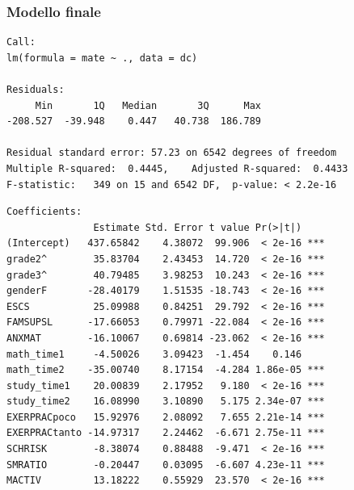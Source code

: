 \documentclass{beamer}
\begin{document}

\begin{frame}[fragile]

\frametitle{Modello finale}
{\footnotesize
\begin{verbatim}
Call:
lm(formula = mate ~ ., data = dc)

Residuals:
     Min       1Q   Median       3Q      Max 
-208.527  -39.948    0.447   40.738  186.789 

Residual standard error: 57.23 on 6542 degrees of freedom
Multiple R-squared:  0.4445,	Adjusted R-squared:  0.4433 
F-statistic:   349 on 15 and 6542 DF,  p-value: < 2.2e-16
\end{verbatim}
}
\end{frame}


\begin{frame}[fragile]

{\footnotesize
\begin{verbatim}
Coefficients:
               Estimate Std. Error t value Pr(>|t|)    
(Intercept)   437.65842    4.38072  99.906  < 2e-16 ***
grade2^        35.83704    2.43453  14.720  < 2e-16 ***
grade3^        40.79485    3.98253  10.243  < 2e-16 ***
genderF       -28.40179    1.51535 -18.743  < 2e-16 ***
ESCS           25.09988    0.84251  29.792  < 2e-16 ***
FAMSUPSL      -17.66053    0.79971 -22.084  < 2e-16 ***
ANXMAT        -16.10067    0.69814 -23.062  < 2e-16 ***
math_time1     -4.50026    3.09423  -1.454    0.146    
math_time2    -35.00740    8.17154  -4.284 1.86e-05 ***
study_time1    20.00839    2.17952   9.180  < 2e-16 ***
study_time2    16.08990    3.10890   5.175 2.34e-07 ***
EXERPRACpoco   15.92976    2.08092   7.655 2.21e-14 ***
EXERPRACtanto -14.97317    2.24462  -6.671 2.75e-11 ***
SCHRISK        -8.38074    0.88488  -9.471  < 2e-16 ***
SMRATIO        -0.20447    0.03095  -6.607 4.23e-11 ***
MACTIV         13.18222    0.55929  23.570  < 2e-16 ***
\end{verbatim}
}
\end{frame}
\end{document}
